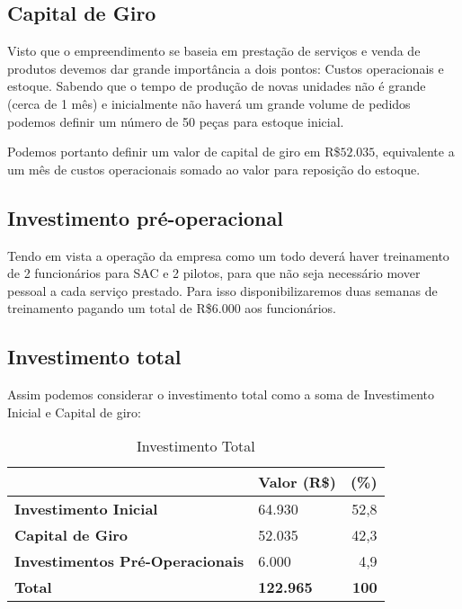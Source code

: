 \subsection{Capital de Giro}

Visto que o empreendimento se baseia em prestação de serviços e venda de produtos devemos dar grande importância a dois pontos: Custos operacionais e estoque. Sabendo que o tempo de produção de novas unidades não é grande (cerca de 1 mês) e inicialmente não haverá um grande volume de pedidos podemos definir um número de 50 peças para estoque inicial.

Podemos portanto definir um valor de capital de giro em R\$$52.035$, equivalente a um mês de custos operacionais somado ao valor para reposição do estoque.

\subsection{Investimento pré-operacional}

Tendo em vista a operação da empresa como um todo deverá haver treinamento de 2 funcionários para SAC e 2 pilotos, para que não seja necessário mover pessoal a cada serviço prestado. Para isso disponibilizaremos duas semanas de treinamento pagando um total de R\$6.000 aos funcionários.

\subsection{Investimento total}

Assim podemos considerar o investimento total como a soma de Investimento Inicial e Capital de giro:


\begin{table}[h]
	\centering
	\begin{tabular}{|l|l|r|}
		\hline
		\textbf{}                      			& \multicolumn{1}{c|}{\textbf{Valor (R\$)}} & \multicolumn{1}{c|}{\textbf{(\%)}} \\ \hline
		\textbf{Investimento Inicial}           & 64.930                                    & 52,8                               \\ \hline
		\textbf{Capital de Giro}                & 52.035                                    & 42,3                               \\ \hline
		\textbf{Investimentos Pré-Operacionais} & 6.000                                     & 4,9                                \\ \hline
		\textbf{Total}                          & \textbf{122.965}                          & \textbf{100}                       \\ \hline
	\end{tabular}
	\caption{Investimento Total}
	\label{investimentoTotal}
\end{table}

